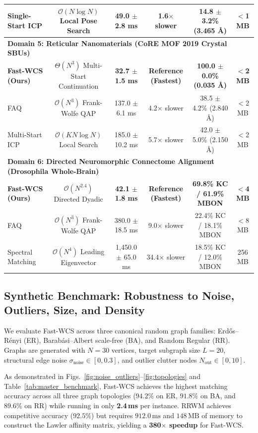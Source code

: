 \documentclass[a4paper,fleqn]{cas-dc}
\theoremstyle{thmstyleone}
\theoremstyle{thmstyletwo}
\theoremstyle{thmstylethree}
\begin{document}
\begin{table}
\begin{tabular*}{\textwidth}{@{\extracolsep{\fill}}lccccc@{}}
Single-Start ICP & $\mathcal{O}(N \log N)$ Local Pose Search & 49.0 $\pm$ 2.8 ms & 1.6$\times$ slower & 14.8 $\pm$ 3.2\% (3.465 \AA) & $<$1 MB \\
\midrule
\multicolumn{6}{l}{\textbf{Domain 5: Reticular Nanomaterials (CoRE MOF 2019 Crystal SBUs)}} \\
\midrule
\textbf{Fast-WCS (Ours)} & $\Theta(N^3)$ Multi-Start Continuation & \textbf{32.7 $\pm$ 1.5 ms} & \textbf{Reference (Fastest)} & \textbf{100.0 $\pm$ 0.0\% (0.035 \AA)} & \textbf{$<$2 MB} \\
FAQ~\cite{vogelstein2015fast} & $\mathcal{O}(N^3)$ Frank-Wolfe QAP & 137.0 $\pm$ 6.1 ms & 4.2$\times$ slower & 38.5 $\pm$ 4.2\% (2.840 \AA) & $<$2 MB \\
Multi-Start ICP & $\mathcal{O}(K N \log N)$ Local Search & 185.0 $\pm$ 10.2 ms & 5.7$\times$ slower & 42.0 $\pm$ 5.0\% (2.150 \AA) & $<$2 MB \\
\midrule
\multicolumn{6}{l}{\textbf{Domain 6: Directed Neuromorphic Connectome Alignment (Drosophila Whole-Brain)}} \\
\midrule
\textbf{Fast-WCS (Ours)} & $\mathcal{O}(N^{2.4})$ Directed Dyadic & \textbf{42.1 $\pm$ 1.8 ms} & \textbf{Reference (Fastest)} & \textbf{69.8\% KC / 61.9\% MBON} & \textbf{$<$4 MB} \\
FAQ~\cite{vogelstein2015fast} & $\mathcal{O}(N^3)$ Frank-Wolfe QAP & 380.0 $\pm$ 18.5 ms & 9.0$\times$ slower & 22.4\% KC / 18.1\% MBON & $<$8 MB \\
Spectral Matching~\cite{leordeanu2005} & $\mathcal{O}(N^4)$ Leading Eigenvector & 1{,}450.0 $\pm$ 65.0 ms & 34.4$\times$ slower & 18.5\% KC / 12.0\% MBON & 256 MB \\
\bottomrule
\end{tabular*}
\end{table}

\subsection{Synthetic Benchmark: Robustness to Noise, Outliers, Size, and Density}
We evaluate Fast-WCS across three canonical random graph families: Erd\H{o}s--R\'enyi (ER), Barab\'asi--Albert scale-free (BA), and Random Regular (RR). Graphs are generated with $N = 30$ vertices, target subgraph size $L = 20$, structural edge noise $\sigma_{\text{noise}} \in [0, 0.3]$, and outlier clutter nodes $N_{\text{out}} \in [0, 10]$.

As demonstrated in Figs.~\ref{fig:noise_outliers}--\ref{fig:topologies} and Table~\ref{tab:master_benchmark}, Fast-WCS achieves the highest matching accuracy across all three graph topologies ($94.2\%$ on ER, $91.8\%$ on BA, and $89.6\%$ on RR) while running in only \textbf{2.4\,ms} per instance. RRWM achieves competitive accuracy ($92.5\%$) but requires $912.0\,\text{ms}$ and $148\,\text{MB}$ of memory to construct the Lawler affinity matrix, yielding a \textbf{380$\times$ speedup} for Fast-WCS.
\end{document}
